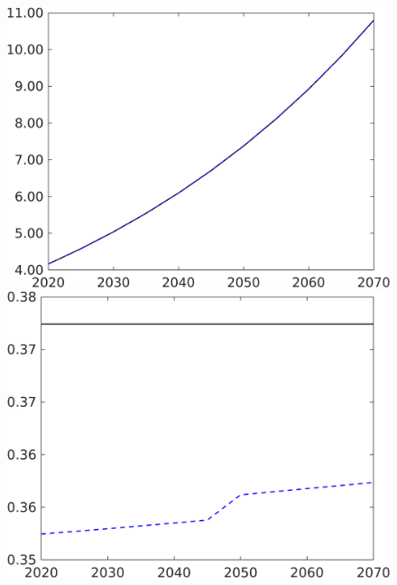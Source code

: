 \begin{figure}[h!!]
\begin{minipage}[]{0.32\textwidth}
	\end{minipage}
	\begin{minipage}[]{0.32\textwidth}
		\includegraphics[width=1\textwidth]{../../codding_model/own_basedOnFried/optimalPol_190722_tidiedUp/figures/all_10Aout22/CountTaul_modxgr_nsk_target_wh_spillover0_sep1_extern0_PV1_etaa0.79_lgd0.png}
	\end{minipage}
	\begin{minipage}[]{0.32\textwidth}
		\includegraphics[width=1\textwidth]{../../codding_model/own_basedOnFried/optimalPol_190722_tidiedUp/figures/all_10Aout22/CountTaul_modxgr_nsk_target_hh_spillover0_sep1_extern0_PV1_etaa0.79_lgd0.png}

\end{minipage}
\end{figure}
